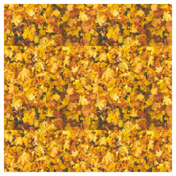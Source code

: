 \begin{figure}[h]
\begin{subfigure}[b]{0.32\textwidth}
    \end{subfigure}
    \begin{subfigure}[b]{0.32\textwidth}
        \centering
        \includegraphics[width=\textwidth]{img/ch6/mosaic_leaves.jpg}
    \end{subfigure}


\end{figure}
